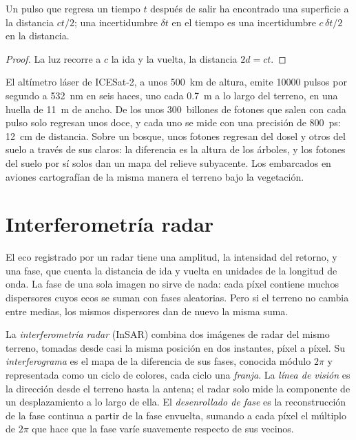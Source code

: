 \begin{proposition}\label{prop:b3:remote-sensing-gis:tof}
Un pulso que regresa un tiempo $t$ después de salir ha encontrado una superficie a la
distancia $ct/2$; una incertidumbre $\delta t$ en el tiempo es una incertidumbre
$c\,\delta t/2$ en la distancia.
\end{proposition}

\begin{proof}
La luz recorre a $c$ la ida y la vuelta, la distancia $2d = ct$.
\end{proof}

El altímetro láser de ICESat-2, a unos \qty{500}{km} de altura, emite
\num{10000} pulsos por segundo a \qty{532}{nm} en seis haces, uno cada
\qty{0.7}{m} a lo largo del terreno, en una huella de \qty{11}{m} de ancho. De los
unos 300~billones de fotones que salen con cada pulso solo regresan unos doce,
y cada uno se mide con una precisión de \qty{800}{ps}: \qty{12}{cm} de distancia. Sobre un
bosque, unos fotones regresan del dosel y otros del suelo
a través de sus claros: la diferencia es la altura de los árboles, y los
fotones del suelo por sí solos dan un mapa del relieve subyacente. Los  embarcados en
aviones cartografían de la misma manera el terreno bajo la vegetación.

\section{Interferometría radar}\label{sec:b3:remote-sensing-gis:insar}

El eco registrado por un radar tiene una amplitud, la intensidad del retorno,
y una fase, que cuenta la distancia de ida y vuelta en unidades de la
longitud de onda. La fase de una sola imagen no sirve de nada: cada píxel contiene muchos
dispersores cuyos ecos se suman con fases aleatorias. Pero si el terreno no
cambia entre medias, los mismos dispersores dan de nuevo la misma suma.

\begin{definition}\label{def:b3:remote-sensing-gis:insar}
La \emph{interferometría radar} (InSAR) combina
dos imágenes de radar del mismo terreno, tomadas desde casi la misma posición
en dos instantes, píxel a píxel. Su \emph{interferograma}
es el mapa de la diferencia de sus fases, conocida módulo $2\pi$ y
representada como un ciclo de colores, cada ciclo una \emph{franja}. La \emph{línea de
visión} es la dirección desde el terreno hasta la
antena; el radar solo mide la componente de un desplazamiento a lo largo de
ella. El \emph{desenrollado de fase} es la reconstrucción
de la fase continua a partir de la fase envuelta, sumando a cada píxel el
múltiplo de $2\pi$ que hace que la fase varíe suavemente respecto de sus vecinos.
\end{definition}

